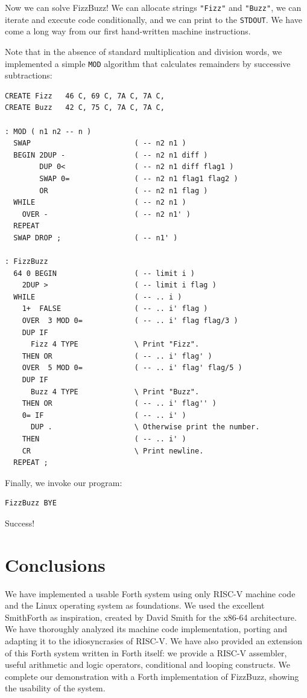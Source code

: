 \documentclass[a4paper,12pt,final]{article}
\begin{document}
Now we can solve FizzBuzz!  We can allocate strings \texttt{"Fizz"} and
\texttt{"Buzz"}, we can iterate and execute code conditionally, and we can
print to the \texttt{STDOUT}.  We have come a long way from our first
hand-written machine instructions.

Note that in the absence of standard multiplication and division
words, we implemented a simple \texttt{MOD} algorithm that calculates
remainders by successive subtractions:

\fontsize{9pt}{9.000000pt}\selectfont
\begin{verbatim}
CREATE Fizz   46 C, 69 C, 7A C, 7A C,
CREATE Buzz   42 C, 75 C, 7A C, 7A C,

: MOD ( n1 n2 -- n )
  SWAP                        ( -- n2 n1 )
  BEGIN 2DUP -                ( -- n2 n1 diff )
        DUP 0<                ( -- n2 n1 diff flag1 )
        SWAP 0=               ( -- n2 n1 flag1 flag2 )
        OR                    ( -- n2 n1 flag )
  WHILE                       ( -- n2 n1 )
    OVER -                    ( -- n2 n1' )
  REPEAT
  SWAP DROP ;                 ( -- n1' )

: FizzBuzz
  64 0 BEGIN                  ( -- limit i )
    2DUP >                    ( -- limit i flag )
  WHILE                       ( -- .. i )
    1+  FALSE                 ( -- .. i' flag )
    OVER  3 MOD 0=            ( -- .. i' flag flag/3 )
    DUP IF
      Fizz 4 TYPE             \ Print "Fizz".
    THEN OR                   ( -- .. i' flag' )
    OVER  5 MOD 0=            ( -- .. i' flag' flag/5 )
    DUP IF
      Buzz 4 TYPE             \ Print "Buzz".
    THEN OR                   ( -- .. i' flag'' )
    0= IF                     ( -- .. i' )
      DUP .                   \ Otherwise print the number.
    THEN                      ( -- .. i' )
    CR                        \ Print newline.
  REPEAT ;
\end{verbatim}
\normalsize

Finally, we invoke our program:

\fontsize{9pt}{9.000000pt}\selectfont
\begin{verbatim}
FizzBuzz BYE
\end{verbatim}
\normalsize

Success!
\pagebreak


\section{Conclusions}
\label{sec:org21e39ae}

We have implemented a usable Forth system using only RISC-V machine
code and the Linux operating system as foundations.  We used the
excellent SmithForth as inspiration, created by David Smith for the
x86-64 architecture.  We have thoroughly analyzed its machine code
implementation, porting and adapting it to the idiosyncrasies of
RISC-V.  We have also provided an extension of this Forth system
written in Forth itself: we provide a RISC-V assembler, useful
arithmetic and logic operators, conditional and looping constructs.
We complete our demonstration with a Forth implementation of FizzBuzz,
showing the usability of the system.
\end{document}
